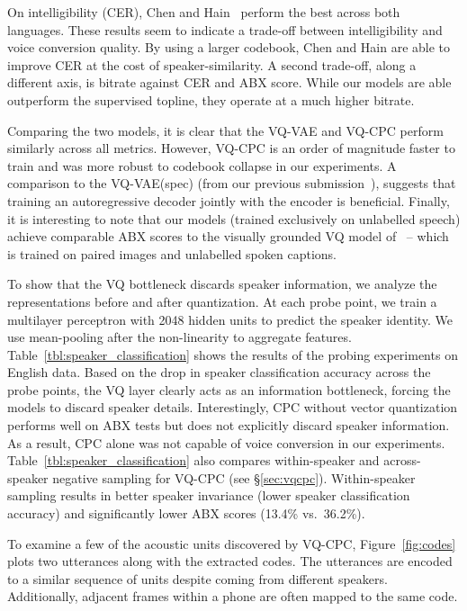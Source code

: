 \documentclass[a4paper]{article}
\begin{document}
On intelligibility (CER), Chen and Hain~\cite{chen+hain_interspeech20} perform the best across both languages.
These results seem to indicate a trade-off between intelligibility and voice conversion quality. 
By using a larger codebook, Chen and Hain are able to improve CER at the cost of speaker-similarity.
A second trade-off, along a different axis, is bitrate against CER and ABX score.
While our models are able outperform the supervised topline, they operate at a much higher bitrate.

Comparing the two models, it is clear that the VQ-VAE and VQ-CPC perform similarly across all metrics.
However, VQ-CPC is an order of magnitude faster to train and was more robust to codebook collapse in our experiments.
A comparison to the VQ-VAE(spec) (from our previous submission~\cite{eloff+etal_interspeech19}), suggests that training an autoregressive decoder jointly with the encoder is beneficial.
Finally, it is interesting to note that our models (trained exclusively on unlabelled speech) achieve comparable ABX scores to the visually grounded VQ model of~\cite{harwath+etal_iclr20} -- which is trained on paired images and unlabelled spoken captions.




To show that the VQ bottleneck discards speaker information, we analyze the representations before and after quantization.
At each probe point, we train a multilayer perceptron with 2048 hidden units to predict the speaker identity.
We use mean-pooling after the non-linearity to aggregate features. 
Table~\ref{tbl:speaker_classification} shows the results of the probing experiments on English data.
Based on the drop in speaker classification accuracy across the probe points, the VQ layer clearly acts as an information bottleneck, forcing the models to discard speaker details.
Interestingly, CPC without vector quantization performs well on ABX tests but does not explicitly discard speaker information.
As a result, CPC alone was not capable of voice conversion in our experiments.
Table~\ref{tbl:speaker_classification} also compares within-speaker and across-speaker negative sampling for VQ-CPC (see \S\ref{sec:vqcpc}).
Within-speaker sampling results in better speaker invariance (lower speaker classification accuracy) and significantly lower ABX scores (13.4\% vs.\ 36.2\%).



To examine a few of the acoustic units discovered by VQ-CPC, Figure~\ref{fig:codes} plots two utterances along with the extracted codes.
The utterances are encoded to a similar sequence of units despite coming from different speakers.
Additionally, adjacent frames within a phone are often mapped to the same code.
\end{document}
